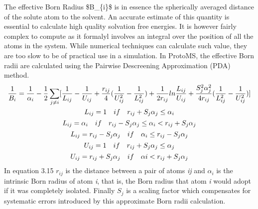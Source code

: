 \documentclass[letterpaper,10pt,english]{sphinxmanual}
\begin{document}
The effective Born Radius \$B\_\{i\}\$ is in essence the spherically averaged distance of the solute atom to the solvent. An accurate estimate of this quantity is essential to calculate high quality solvation free energies. It is however fairly complex to compute as it formalyl involves an integral over the position of all the atoms in the system. While numerical techniques can calculate such value, they are too slow to be of practical use in a simulation. In ProtoMS, the effective Born radii are calculated using the Pairwise Descreening Approximation (PDA) method.
\begin{gather}
\begin{split}{\frac{1}{B_i}} = \frac{1}{\alpha _{i}} - \frac{1}{2} \sum_{j \not= i} \lbrack \frac{1}{L_{ij}}-\frac{1}{U_{ij}}+\frac{r_{ij}}{4}(\frac{1}{U_{ij}^{2}}-\frac{1}{L_{ij}^{2}}) +\frac{1}{2r_{ij}}ln\frac{L_{ij}}{U_{ij}} + \frac{S_{j}^{2}\alpha_{j}^{2}}{4r_{ij}}(\frac{1}{L_{ij}^{2}}-\frac{1}{U_{ij}^{2}} ) \rbrack\end{split}\notag\\\begin{split}L_{ij} &= 1 \quad if \quad r_{ij} + S_{j}\alpha_{j} \leq \alpha_{i} \\\end{split}\notag\\\begin{split}L_{ij} &= \alpha_{i} \quad if \quad r_{ij} - S_{j}\alpha_{j} \leq \alpha_{i}  <r_{ij} + S_{j}\alpha_{j}\\\end{split}\notag\\\begin{split}L_{ij} &= r_{ij} - S_{j}\alpha_{j} \quad if \quad \alpha_{i} \leq r_{ij} - S_{j}\alpha_{j}\\\end{split}\notag\\\begin{split}U_{ij} &= 1 \quad if \quad  r_{ij} + S_{j}\alpha_{j} \leq \alpha_{j}\\\end{split}\notag\\\begin{split}U_{ij} &= r_{ij} + S_{j}\alpha_{j} \quad if \quad \alpha{i} <  r_{ij} + S_{j}\alpha_{j}\\\end{split}\notag
\end{gather}
In equation 3.15 \(r_{ij}\) is the distance between a pair of atoms \emph{ij} and \(\alpha_{i}\) is the intrinsic Born radius of atom \emph{i}, that is, the Born radius that atom \emph{i} would adopt if it was completely isolated. Finally \(S_{j}\) is a scaling factor which compensates for systematic errors introduced by this approximate Born radii calculation.
\end{document}
